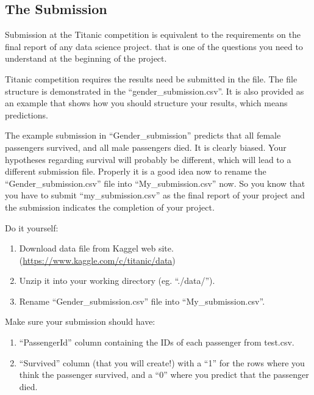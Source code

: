 \documentclass[
]{book}
\makeatletter
\providecommand{\tightlist}{%
  \setlength{\itemsep}{0pt}\setlength{\parskip}{0pt}}
\newenvironment{kframe}{%
\medskip{}
\setlength{\fboxsep}{.8em}
 \def\at@end@of@kframe{}%
 \ifinner\ifhmode%
  \def\at@end@of@kframe{\end{minipage}}%
  \begin{minipage}{\columnwidth}%
 \fi\fi%
 \def\FrameCommand##1{\hskip\@totalleftmargin \hskip-\fboxsep
 \colorbox{shadecolor}{##1}\hskip-\fboxsep
     \hskip-\linewidth \hskip-\@totalleftmargin \hskip\columnwidth}%
 \MakeFramed {\advance\hsize-\width
   \@totalleftmargin\z@ \linewidth\hsize
   \@setminipage}}%
 {\par\unskip\endMakeFramed%
 \at@end@of@kframe}
\newenvironment{rmdblock}[1]
  {
  \begin{itemize}
  \renewcommand{\labelitemi}{
    \raisebox{-.7\height}[0pt][0pt]{
      {\setkeys{Gin}{width=3em,keepaspectratio}\texttt{[image: images/\#1]}}
    }
  }
  \setlength{\fboxsep}{1em}
  \begin{kframe}
  \item
  }
  {
  \end{kframe}
  \end{itemize}
  }
\newenvironment{rmdaction}
  {\begin{rmdblock}{action}}
  {\end{rmdblock}}
\makeatother
\begin{document}
\hypertarget{the-submission}{%
\subsection*{The Submission}\label{the-submission}}


Submission at the Titanic competition is equivalent to the requirements on the final report of any data science project. that is one of the questions you need to understand at the beginning of the project.

Titanic competition requires the results need be submitted in the file. The file structure is demonstrated in the ``gender\_submission.csv''. It is also provided as an example that shows how you should structure your results, which means predictions.

The example submission in ``Gender\_submission'' predicts that all female passengers survived, and all male passengers died. It is clearly biased. Your hypotheses regarding survival will probably be different, which will lead to a different submission file. Properly it is a good idea now to rename the ``Gender\_submission.csv'' file into ``My\_submission.csv'' now. So you know that you have to submit ``my\_submission.csv'' as the final report of your project and the submission indicates the completion of your project.

\begin{rmdaction}
Do it yourself:

\begin{enumerate}
\def\labelenumi{\arabic{enumi}.}
\tightlist
\item
  Download data file from Kaggel web site.(\url{https://www.kaggle.com/c/titanic/data})
\item
  Unzip it into your working directory (eg. ``./data/'').
\item
  Rename ``Gender\_submission.csv'' file into ``My\_submission.csv''.
\end{enumerate}
\end{rmdaction}

Make sure your submission should have:

\begin{enumerate}
\def\labelenumi{\arabic{enumi}.}
\tightlist
\item
  ``PassengerId'' column containing the IDs of each passenger from test.csv.
\item
  ``Survived'' column (that you will create!) with a ``1'' for the rows where you think the passenger survived, and a ``0'' where you predict that the passenger died.
\end{enumerate}
\end{document}
